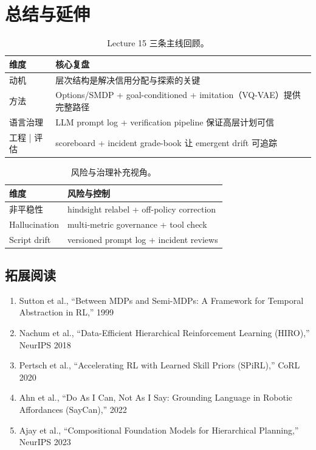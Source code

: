 \section{总结与延伸}

\begin{table}[H]
\centering
\begin{tabular}{p{3.5cm}p{8cm}}
\toprule
维度 & 核心复盘 \\
\midrule
动机 & 层次结构是解决信用分配与探索的关键 \\
方法 & Options/SMDP + goal-conditioned + imitation（VQ-VAE）提供完整路径 \\
语言治理 & LLM prompt log + verification pipeline 保证高层计划可信 \\
工程 | 评估 & scoreboard + incident grade-book 让 emergent drift 可追踪 \\
\bottomrule
\end{tabular}
\caption{Lecture 15 三条主线回顾。}
\end{table}

\begin{table}[H]
\centering
\begin{tabular}{p{3.5cm}p{8cm}}
\toprule
维度 & 风险与控制 \\
\midrule
非平稳性 & hindsight relabel + off-policy correction \\
Hallucination & multi-metric governance + tool check \\
Script drift & versioned prompt log + incident reviews \\
\bottomrule
\end{tabular}
\caption{风险与治理补充视角。}
\end{table}

\subsection{拓展阅读}
\begin{enumerate}
    \item Sutton et al., ``Between MDPs and Semi-MDPs: A Framework for Temporal Abstraction in RL,'' 1999
    \item Nachum et al., ``Data-Efficient Hierarchical Reinforcement Learning (HIRO),'' NeurIPS 2018
    \item Pertsch et al., ``Accelerating RL with Learned Skill Priors (SPiRL),'' CoRL 2020
    \item Ahn et al., ``Do As I Can, Not As I Say: Grounding Language in Robotic Affordances (SayCan),'' 2022
    \item Ajay et al., ``Compositional Foundation Models for Hierarchical Planning,'' NeurIPS 2023
\end{enumerate}


